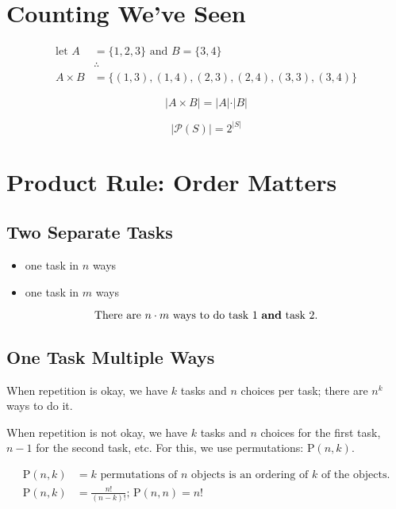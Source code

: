\documentclass{report}
\begin{document}
\section{Counting We've Seen}

\begin{align*}
    \text{let } A &= \{1, 2, 3\} \text{ and } B = \{3, 4\}
    \\ &\therefore \\
    A \times B &= \{(1, 3), (1, 4), (2, 3), (2, 4), (3, 3), (3, 4)\}
\end{align*}


\begin{equation}
    \vert A \times B \vert = \vert A \vert \cdot \vert B \vert
\end{equation}

\begin{equation}
    \vert \mathcal{P}(S) \vert = 2^{\vert S \vert}
\end{equation}

\section{Product Rule: Order Matters}

\subsection{Two Separate Tasks}
\begin{itemize}
    \item one task in $n$ ways
    \item one task in $m$ ways
\end{itemize}

\begin{equation}
    \text{There are } n \cdot m \text{ ways to do task 1 \textbf{and} task 2.}
\end{equation}

\subsection{One Task Multiple Ways}
When repetition is okay, we have $k$ tasks and $n$ choices per task; there are $n^k$ ways to do it.

When repetition is not okay, we have $k$ tasks and $n$ choices for the first task, $n-1$ for the second task, etc. For this, we use permutations: $\text{P}(n, k)$.

\begin{align}
    \text{$\text{P}(n, k)$} &= \text{$k$ permutations of $n$ objects is an ordering of $k$ of the objects.} \\
    \text{P}(n, k) &= \frac{n!}{(n-k)!} \text{; } \text{P}(n, n) = n!
\end{align}
\end{document}
